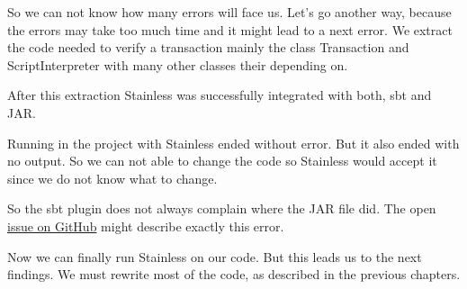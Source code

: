 So we can not know how many errors will face us.
Let's go another way, because the errors may take too much time and it might lead to a next error.
We extract the code needed to verify a transaction mainly the class Transaction and ScriptInterpreter with many other classes their depending on.

After this extraction Stainless was successfully integrated with both, sbt and JAR.

Running  in the project with Stainless ended without error.
But it also ended with no output.
So we can not able to change the code so Stainless would accept it since we do not know what to change.

So the sbt plugin does not always complain where the JAR file did.
The open \href{https://github.com/epfl-lara/stainless/issues/484}{issue  on GitHub} might describe exactly this error.

Now we can finally run Stainless on our code.
But this leads us to the next findings.
We must rewrite most of the code, as described in the previous chapters.
